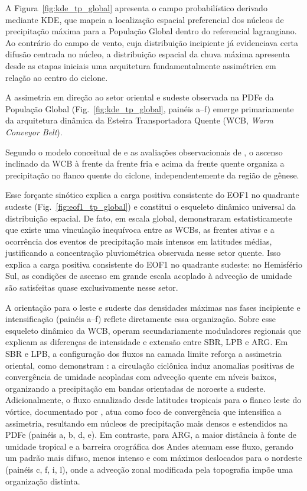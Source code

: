A Figura~\ref{fig:kde_tp_global} apresenta o campo probabilístico derivado mediante KDE, que mapeia a localização espacial preferencial dos núcleos de precipitação máxima para a População Global dentro do referencial lagrangiano.
Ao contrário do campo de vento, cuja distribuição incipiente já evidenciava certa difusão centrada no núcleo, a distribuição espacial da chuva máxima apresenta desde as etapas iniciais uma arquitetura fundamentalmente assimétrica em relação ao centro do ciclone.

A assimetria em direção ao setor oriental e sudeste observada na PDFe da População Global (Fig.~\ref{fig:kde_tp_global}, painéis a--f) emerge primariamente da arquitetura dinâmica da Esteira Transportadora Quente (WCB, \textit{Warm Conveyor Belt}).

Segundo o modelo conceitual de \citet{browning1986conceptual} e as avaliações observacionais de \citet{naud2020evaluation}, o ascenso inclinado da WCB à frente da frente fria e acima da frente quente organiza a precipitação no flanco quente do ciclone, independentemente da região de gênese.

Esse forçante sinótico explica a carga positiva consistente do EOF1 no quadrante sudeste (Fig.~\ref{fig:eof1_tp_global}) e constitui o esqueleto dinâmico universal da distribuição espacial.
De fato, em escala global, \citet{catto2015fronts} demonstraram estatisticamente que existe uma vinculação inequívoca entre as WCBs, as frentes ativas e a ocorrência dos eventos de precipitação mais intensos em latitudes médias, justificando a concentração pluviométrica observada nesse setor quente. Isso explica a carga positiva consistente do EOF1 no quadrante sudeste: no Hemisfério Sul, as condições de ascenso em grande escala acoplado à advecção de umidade são satisfeitas quase exclusivamente nesse setor.

A orientação para o leste e sudeste das densidades máximas nas fases incipiente e intensificação (painéis a--f) reflete diretamente essa organização.
Sobre esse esqueleto dinâmico da WCB, operam secundariamente moduladores regionais que explicam as diferenças de intensidade e extensão entre SBR, LPB e ARG. Em SBR e LPB, a configuração dos fluxos na camada limite reforça a assimetria oriental, como demonstram \citet{cardoso2022synoptic}: a circulação ciclônica induz anomalias positivas de convergência de umidade acopladas com advecção quente em níveis baixos, organizando a precipitação em bandas orientadas de noroeste a sudeste.
Adicionalmente, o fluxo canalizado desde latitudes tropicais para o flanco leste do vórtice, documentado por \citet{vera2002cold}, atua como foco de convergência que intensifica a assimetria, resultando em núcleos de precipitação mais densos e estendidos na PDFe (painéis a, b, d, e).
Em contraste, para ARG, a maior distância à fonte de umidade tropical e a barreira orográfica dos Andes atenuam esse fluxo, gerando um padrão mais difuso, menos intenso e com máximos deslocados para o nordeste (painéis c, f, i, l), onde a advecção zonal modificada pela topografia impõe uma organização distinta.

